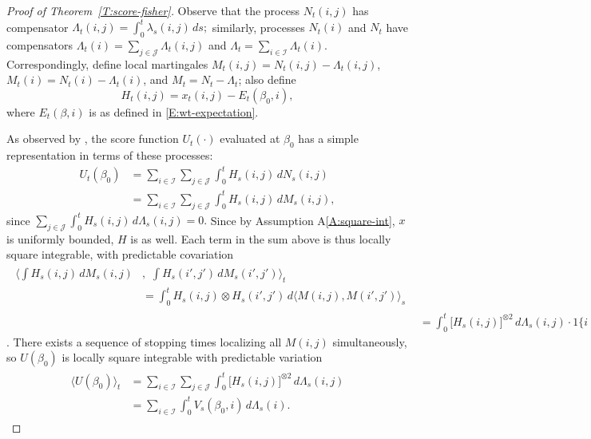 \documentclass[final]{statsoc}
\begin{document}
\begin{proof}[Proof of Theorem~\ref{T:score-fisher}]
Observe that the process $N_t(i,j)$ has compensator
\(
    \Lambda_t(i,j)
        =
            \int_0^t \lambda_s(i,j) \, ds;
\)
similarly, processes $N_t(i)$ and $N_t$ have compensators
$\Lambda_t(i) = \sum_{j \in \mathcal{J}} \Lambda_t(i,j)$
and $\Lambda_t = \sum_{i \in \mathcal{I}} \Lambda_t(i)$.  Correspondingly,
define local martingales $M_t(i,j) = N_t(i,j) - \Lambda_t(i,j)$,
$M_t(i) = N_t(i) - \Lambda_t(i)$, and $M_t = N_t - \Lambda_t$;
also define
\[
    H_t(i,j)
        =
        x_t(i,j) - E_t(\beta_0,i),
\]
where $E_t(\beta,i)$ is as defined in \eqref{E:wt-expectation}.

As observed by \citet{andersen1982cox}, the score function
$U_t(\cdot)$ evaluated at $\beta_0$ has
a simple representation in terms of these processes:
\begin{align*}
    U_t(\beta_0)
        &=
        \sum_{i \in \mathcal{I}}
        \sum_{j \in \mathcal{J}}
        \int_0^t
            H_s(i,j) \, dN_s(i,j) \\
        &=
        \sum_{i \in \mathcal{I}}
        \sum_{j \in \mathcal{J}}
        \int_0^t
            H_s(i,j) \, dM_s(i,j),
\end{align*}
since
\(
    \sum_{j \in \mathcal{J}}
    \int_0^t
        H_s(i,j) \,
        d\Lambda_s(i,j)
    =
    0.
\)
Since by Assumption A\ref{A:square-int}, $x$ is uniformly bounded, $H$
is as well.  Each term in the sum above is thus locally square integrable,
with predictable covariation
\begin{align*}
    \begin{split}
        \bigg\langle
            \int
                H_s(i,j) \, dM_s(i,j)
        &, \, \,
            \int
                H_s(i',j') \, dM_s(i',j')
        \bigg\rangle_t \\
        &=
            \int_0^t
                H_s(i,j) \otimes H_s(i',j') \,
                d\big\langle M(i,j), M(i',j')\big\rangle_s
    \end{split} \\
        &=
            \int_0^t
                \big[ H_s(i,j) \big]^{\otimes 2} \,
                d\Lambda_s(i,j)
            \cdot
            1\{ i = i', j = j' \}
\end{align*}
\citep[Thm.~2.4.3]{fleming1991counting}.  There exists a sequence
of stopping times localizing all $M(i,j)$ simultaneously, so $U(\beta_0)$ is
locally square integrable with predictable variation
\begin{align}
\begin{split}\label{E:score-compensator}
    \big\langle U(\beta_0) \big\rangle_t
        &=
            \sum_{i \in \mathcal{I}}
            \sum_{j \in \mathcal{J}}
            \int_0^t
                \big[ H_s(i,j) \big]^{\otimes 2} \,
                d\Lambda_s(i,j) \\
        &=
            \sum_{i \in \mathcal{I}}
            \int_0^t
                V_s(\beta_0, i) \,
                d\Lambda_s(i).
\end{split}
\end{align}


\end{proof}
\end{document}
